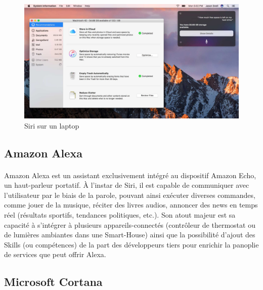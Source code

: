 \begin{figure}[H]
	\centering
	\includegraphics[width=0.75\linewidth]{images/apple_siri/macbook.png} 
	\caption{Siri sur un laptop  \citep{macossiridemo}}
	\label{fig:macbooksiri}
	
\end{figure}


\subsection{Amazon Alexa}\label{alexa}
\paragraph{}Amazon Alexa est un assistant exclusivement intégré au dispositif Amazon Echo, un haut-parleur portatif. À l'instar de Siri, il est capable de communiquer avec l'utilisateur par le biais de la parole, pouvant ainsi exécuter diverses commandes, comme jouer de la musique, réciter des livres audios, annoncer des news en temps réel (résultats sportifs, tendances politiques, etc.). Son atout majeur est sa capacité à s'intégrer à plusieurs appareils-connectés (contrôleur de thermostat ou de lumières ambiantes dans une Smart-House) ainsi que la possibilité d'ajout des Skills (ou compétences) de la part des développeurs tiers pour enrichir la panoplie de services que peut offrir Alexa.


\subsection{Microsoft Cortana}

